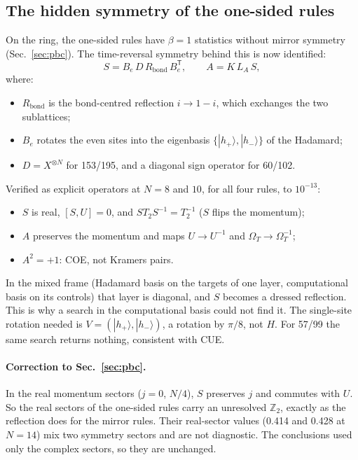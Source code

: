 \subsection{The hidden symmetry of the one-sided rules}
On the ring, the one-sided rules have $\beta=1$ statistics without mirror symmetry (Sec.~\ref{sec:pbc}). The
time-reversal symmetry behind this is now identified:
\begin{equation}
  S=B_e\,D\,R_\mathrm{bond}\,B_e^{\mathsf T},\qquad A=K\,L_A\,S,
\end{equation}
where:
\begin{itemize}
\item $R_\mathrm{bond}$ is the bond-centred reflection $i\to1-i$, which exchanges the two sublattices;
\item $B_e$ rotates the even sites into the eigenbasis $\{|h_+\rangle,|h_-\rangle\}$ of the Hadamard;
\item $D=X^{\otimes N}$ for 153/195, and a diagonal sign operator for 60/102.
\end{itemize}
Verified as explicit operators at $N=8$ and $10$, for all four rules, to $10^{-13}$:
\begin{itemize}
\item $S$ is real, $[S,U]=0$, and $ST_2S^{-1}=T_2^{-1}$ ($S$ flips the momentum);
\item $A$ preserves the momentum and maps $U\to U^{-1}$ and $\Omega_T\to\Omega_T^{-1}$;
\item $A^2=+1$: COE, not Kramers pairs.
\end{itemize}
In the mixed frame (Hadamard basis on the targets of one layer, computational basis on its controls) that layer is
diagonal, and $S$ becomes a dressed reflection. This is why a search in the computational basis could not find it. The
single-site rotation needed is $V=(|h_+\rangle,|h_-\rangle)$, a rotation by $\pi/8$, not $H$. For 57/99 the same search
returns nothing, consistent with CUE.

\paragraph{Correction to Sec.~\ref{sec:pbc}.} In the real momentum sectors ($j=0$, $N/4$), $S$ preserves $j$ and commutes
with $U$. So the real sectors of the one-sided rules carry an unresolved $\mathbb Z_2$, exactly as the reflection does for
the mirror rules. Their real-sector values (0.414 and 0.428 at $N=14$) mix two symmetry sectors and are not
diagnostic. The conclusions used only the complex sectors, so they are unchanged.

